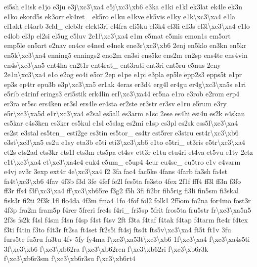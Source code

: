 {ei5sh e1isk e1jo e3ju e3j\textbackslash{}xc3\textbackslash{}xa4 e5j\textbackslash{}xc3\textbackslash{}xb6 e3ka e1ki e1kl ek3lat ek4le ek3n e1ko ekord5s ek3orr ek4ret\-\_\- ek5ro e1ku e1kve ek5vis e1ky e1k\textbackslash{}xc3\textbackslash{}xa4 e1la el1akt el4arb 3eld\-\_\- eleb3r elekt3ri el4fra eli5ku el3k4 el3li ell3s el3l\textbackslash{}xc3\textbackslash{}xa4 e1lo e4lob el3p el2si el5ug e5luv 2e1l\textbackslash{}xc3\textbackslash{}xa4 e1m e5mat e5mis emon1s em5ort emp5le en5art e2nav en4ce e4ned e4nek ene3r\textbackslash{}xc3\textbackslash{}xb6 2enj en5klo en3kn en5kr en5k\textbackslash{}xc3\textbackslash{}xa4 enning5 ennings2 eno2m en3si ens5ke ens2m en2sp ens4te ens4vin en4s\textbackslash{}xc3\textbackslash{}xa5 ent4ha en2t1r ent4rat\-\_\- ent3rati ent3ri ent5ru e5nus 2eny 2e1n\textbackslash{}xc3\textbackslash{}xa4 e1o e2og eo4i e5or 2ep e1pe e1pi e3pla ep5le epp2s3 epps5t e1pr ep3s ep4tr epu3b e3p\textbackslash{}xc3\textbackslash{}xa5 er1ak 4eras er3d4 erg4l er4gu er4g\textbackslash{}xc3\textbackslash{}xa5s e1ri e5rib e4rinf erings3 eri5stik erk4lin erl\textbackslash{}xc3\textbackslash{}xa44 er5na e1ro e3rob e2rom erp4 er3ra er5sc ers4ken er3sl ers4le er4sta er2ste er3str er3sv e1ru e5rum e3ry e5r\textbackslash{}xc3\textbackslash{}xa5d e1r\textbackslash{}xc3\textbackslash{}xa4 e2sal es5all es3arm e1sc 2ese es4hi esi4u es2k e4skan es5kar e4s3ken es3ker es5kul e1sl e5slag es2mi e1sp es3pl es2sk ess5l\textbackslash{}xc3\textbackslash{}xa4 es2st e3stal es5ten\-\_\- esti2ge es3tin es5tor\-\_\- es4tr est5rer e3stru est4r\textbackslash{}xc3\textbackslash{}xb6 e3st\textbackslash{}xc3\textbackslash{}xa5 es2u e1sy eta3b e5ti eti3\textbackslash{}xc3\textbackslash{}xb6 e1to e5tri\-\_\- et3ris e5tr\textbackslash{}xc3\textbackslash{}xa4 et2s ets2ad ets3kr ets1l ets3m ets5pa et4sv ett3r e1tu etu4ri et4va et5vu e1ty 2etz e1t\textbackslash{}xc3\textbackslash{}xa4 et\textbackslash{}xc3\textbackslash{}xa4c4 euk4 e5um\-\_\- e5up4 4eur eu4se\-\_\- eu5tro e1v e4varm e4vj ev3r 3exp ext4r 4e\textbackslash{}xc3\textbackslash{}xa4 f2 3fa fac4 fac5ke 4fans 4farb fa3sh fa4st fa4t\textbackslash{}xc3\textbackslash{}xb6 4fav 4f3b f3d 3fe 4fef fe2l fes5ta fe3sto 4fex 2f1f fff4 ff3l ff3n f3fo ff3r ffs4 f3f\textbackslash{}xc3\textbackslash{}xa4 ff\textbackslash{}xc3\textbackslash{}xb65re f3g2 f5h 3fi fi2br fib5rig fi3li fin5sm fi3skal fisk3r fi2ti 2f3k 1fl flo4da 4f3m fma4 1fo 4fof fol2 folk1 2f5om fo2na for4mo fost3r 4f3p fra2m fram5p f4rer 5freri fre4s f4ri\-\_\- fri5sp 5frit fros5ta fru5str fr\textbackslash{}xc3\textbackslash{}xa5n5 2f3s fs2k f4sl f4sm f4sn f4sp f4st f4sv 2ft f3ta f4taf f4tak f4tap f4tarm fte4r f4tex f3ti f4tin f3to f4t3r ft2sa ft4set ft2s5i ft4sj fts4t fts5v\textbackslash{}xc3\textbackslash{}xa4 ft5t ft1v 3fu furs5te fu5ru fu3tu 4fv 5fy fy4ma f\textbackslash{}xc3\textbackslash{}xa53t\textbackslash{}xc3\textbackslash{}xb6 1f\textbackslash{}xc3\textbackslash{}xa4 f\textbackslash{}xc3\textbackslash{}xa4s5ti 3f\textbackslash{}xc3\textbackslash{}xb6 f\textbackslash{}xc3\textbackslash{}xb62ra f\textbackslash{}xc3\textbackslash{}xb62ren f\textbackslash{}xc3\textbackslash{}xb62ri f\textbackslash{}xc3\textbackslash{}xb6r3k f\textbackslash{}xc3\textbackslash{}xb6r3sm f\textbackslash{}xc3\textbackslash{}xb6r3su f\textbackslash{}xc3\textbackslash{}xb6rt4 }
